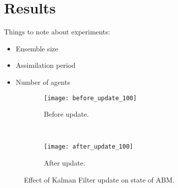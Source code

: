 \chapter{Results}\label{ch:results}

Things to note about experiments:
\begin{itemize}
    \item Ensemble size
    \item Assimilation period
    \item Number of agents
\end{itemize}


\begin{figure}[h]
    \centering
    \begin{subfigure}[h]{0.4\textwidth}
        \texttt{[image: before\_update\_100]}
        \caption{Before update.}
        \label{fig:abm_before}
    \end{subfigure}
    ~
    \begin{subfigure}[h]{0.4\textwidth}
        \texttt{[image: after\_update\_100]}
        \caption{After update.}
        \label{fig:abm_after}
    \end{subfigure}
    \caption{Effect of Kalman Filter update on state of ABM.}
    \label{fig:enkf_abm}
\end{figure}

